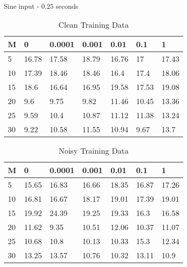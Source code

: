 \documentclass{beamer}
\begin{document}
\begin{frame}{Sine input - $0.25$ seconds}
    \scriptsize
    \begin{table}[!ht]
        \centering
        \begin{tabular}{|l|l|l|l|l|l|l|}
        \hline
            M & 0 & 0.0001 & 0.001 & 0.01 & 0.1 & 1 \\ \hline
            5 & 16.78 & 17.58 & 18.79 & 16.76 & 17 & 17.43 \\ \hline
            10 & 17.39 & 18.46 & 18.46 & 16.4 & 17.4 & 18.06 \\ \hline
            15 & 18.6 & 16.64 & 16.95 & 19.58 & 17.53 & 19.08 \\ \hline
            20 & 9.6 & 9.75 & 9.82 & 11.46 & 10.45 & 13.36 \\ \hline
            25 & 9.59 & 10.4 & 10.87 & 11.12 & 11.38 & 13.24 \\ \hline
            30 & 9.22 & 10.58 & 11.55 & 10.94 & 9.67 & 13.7 \\ \hline
        \end{tabular}
        \caption{Clean Training Data}
    \end{table}

    \begin{table}[!ht]
        \centering
        \begin{tabular}{|l|l|l|l|l|l|l|}
        \hline
            M & 0 & 0.0001 & 0.001 & 0.01 & 0.1 & 1 \\ \hline
            5 & 15.65 & 16.83 & 16.66 & 18.35 & 16.87 & 17.26 \\ \hline
            10 & 16.81 & 16.67 & 18.17 & 19.01 & 17.39 & 19.01 \\ \hline
            15 & 19.92 & 24.39 & 19.25 & 19.33 & 16.3 & 16.58 \\ \hline
            20 & 11.62 & 9.35 & 10.51 & 12.06 & 10.37 & 11.07 \\ \hline
            25 & 10.68 & 10.8 & 10.13 & 10.33 & 15.3 & 12.34 \\ \hline
            30 & 13.25 & 13.57 & 10.76 & 10.32 & 13.11 & 10.9 \\ \hline
        \end{tabular}
        \caption{Noisy Training Data}
    \end{table}
\end{frame}
\end{document}
